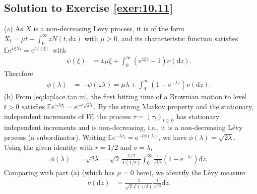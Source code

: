\documentclass[12pt]{book}
\numberwithin{equation}{chapter}
\theoremstyle{plain}
\numberwithin{theorem}{section}
\theoremstyle{definition}
\numberwithin{exercise}{chapter}
\newcommand{\<}{\langle}
\renewcommand{\>}{\rangle}
\renewcommand{\(}{\left(}
\renewcommand{\)}{\right)}
\renewcommand{\[}{\left[}
\renewcommand{\]}{\right]}
\newcommand\Eb{\mathds{E}}
\newcommand\Gam{\Gamma}
\newcommand\lam{\lambda}
\newcommand\ii{\mathtt{i}}
\newcommand\dd{\mathrm{d}}
\newcommand\ee{\mathrm{e}}
\begin{document}
\subsection*{Solution to Exercise \ref{exer:10.11}}
(a) As $X$ is a non-decreasing L\'evy process, it is of the form $X_t = \mu t + \int_0^\infty z N(t,\dd z)$ with $\mu \geq 0$, and its characteristic function satisfies $\Eb \ee^{\ii \xi X_t} = \ee^{t \psi(\xi)}$ with
\begin{align}
\psi(\xi)
	&=	\ii \mu \xi + \int_0^\infty (\ee^{\ii \xi z } - 1 ) \nu(\dd z) .
\end{align}
Therefore
\begin{align}
\phi(\lam)
	&=	- \psi(\ii \lam)
	=		\mu \lam + \int_0^\infty (1 - \ee^{- \lam z} ) \nu(\dd z) .
\end{align}
(b) From \eqref{eq:laplace.tau.m}, the first hitting time of a Brownian motion to level $t > 0$ satisfies $\Eb \ee^{- \lam \tau_t} = \ee^{- t \sqrt{2 \lam}}$.  By the strong Markov property and the stationary, independent increments of $W$, the process $\tau = (\tau_t)_{t \geq 0}$ has stationary independent increments and is non-decreasing, i.e., it is a non-decreasing L\'evy process (a subordinator).  Writing $\Eb \ee^{- \lam \tau_t} = \ee^{- t \phi(\lam)}$, we have $\phi(\lam) = \sqrt{2\lam}$.  Using the given identity with $r = 1/2$ and $v = \lam$,
\begin{align}
\phi(\lam)
	&=	\sqrt{2 \lam}
	=		\sqrt{2} \, \frac{1/2}{\Gam(1/2)} \int_0^\infty \frac{1}{z^{3/2}}(1 - \ee^{- \lam z}) \dd z .
\end{align}
Comparing with part (a) (which has $\mu = 0$ here), we identify the L\'evy measure
\begin{align}
\nu(\dd z)
	&=	 \frac{1}{\sqrt{2} \, \Gam(1/2)} \frac{1}{z^{3/2}} \dd z .
\end{align}
\end{document}
